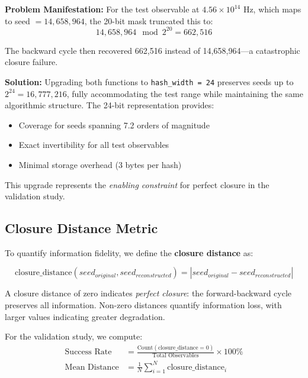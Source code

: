 \documentclass[11pt,letterpaper]{article}
\begin{document}
\textbf{Problem Manifestation:} For the test observable at $4.56 \times 10^{14}$ Hz, which maps to seed $= 14,658,964$, the 20-bit mask truncated this to:
\begin{equation}
14,658,964 \mod 2^{20} = 662,516
\end{equation}

The backward cycle then recovered 662,516 instead of 14,658,964—a catastrophic closure failure.

\textbf{Solution:} Upgrading both functions to \texttt{hash\_width = 24} preserves seeds up to $2^{24} = 16,777,216$, fully accommodating the test range while maintaining the same algorithmic structure. The 24-bit representation provides:
\begin{itemize}
    \item Coverage for seeds spanning 7.2 orders of magnitude
    \item Exact invertibility for all test observables
    \item Minimal storage overhead (3 bytes per hash)
\end{itemize}

This upgrade represents the \textit{enabling constraint} for perfect closure in the validation study.

\subsection{Closure Distance Metric}
\label{subsec:metric}

To quantify information fidelity, we define the \textbf{closure distance} as:

\begin{equation}
\text{closure\_distance}(seed_{original}, seed_{reconstructed}) = |seed_{original} - seed_{reconstructed}|
\end{equation}

A closure distance of zero indicates \textit{perfect closure}: the forward-backward cycle preserves all information. Non-zero distances quantify information loss, with larger values indicating greater degradation.

For the validation study, we compute:
\begin{align}
\text{Success Rate} &= \frac{\text{Count}(\text{closure\_distance} = 0)}{\text{Total Observables}} \times 100\% \\
\text{Mean Distance} &= \frac{1}{N}\sum_{i=1}^{N} \text{closure\_distance}_i
\end{align}
\end{document}
